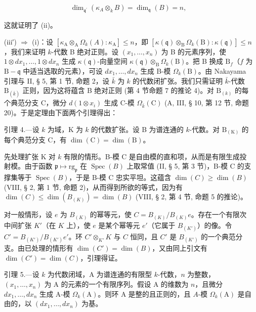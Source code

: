 \[
\dim_ {\mathfrak {q} ^ {\prime}} \left(\kappa_ {A} \otimes_ {k} B\right) = \dim_ {\mathfrak {q}} (B) = n,
\]

这就证明了 (ii)。

(iii′) \(\Rightarrow\) (i)：设 \([\kappa_{\mathrm{A}}\otimes_{\mathrm{A}}\Omega_{k}(A):\kappa_{\mathrm{A}}]\leqslant n\)，即 \([\kappa (\mathfrak{q})\otimes_{\mathrm{B}}\Omega_{k}(\mathrm{B}):\kappa (\mathfrak{q})]\leqslant n\)，我们来证明 \(k\)-代数 B 绝对正则。设 \((x_{1},\ldots ,x_{n})\) 为 B 的元素序列，使 \(1\otimes dx_1,\dots ,1\otimes dx_n\) 生成 \(\kappa (\mathfrak{q})\)-向量空间 \(\kappa (\mathfrak{q})\otimes_{\mathrm{B}}\Omega_{k}(\mathrm{B})\)。把 B 换成 \(\mathrm{B}_f\)（\(f\) 为 \(\mathrm{B} - \mathfrak{q}\) 中适当选取的元素），可设 \(dx_{1},\ldots ,dx_{n}\) 生成 B-模 \(\Omega_k(\mathrm{B})\)。由 Nakayama 引理与 II, § 5, 第 1 节, 命题 2，设 \(\bar{k}\) 为 \(k\) 的代数闭扩张。我们只需证明 \(\bar{k}\)-代数 \(\mathrm{B}_{(\bar{k})}\) 正则，因为这将蕴含 B 绝对正则 (第 4 节命题 7 的推论 4)。对 \(\mathrm{B}_{(k)}\) 的每个典范分支 C，微分 \(d(1\otimes x_i)\) 生成 C-模 \(\Omega_{\bar{k}}(\mathrm{C})\) (A, III, § 10, 第 12 节, 命题 20)。于是定理由下面两个引理得出：

引理 4.—设 \(k\) 为域，K 为 \(k\) 的代数扩张。设 B 为谱连通的 \(k\)-代数。对 \(\mathrm{B}_{(\mathrm{K})}\) 的每个典范分支 C，有 \(\dim(\mathrm{C}) = \dim(\mathrm{B})\)。

先处理扩张 K 对 \(k\) 有限的情形。B-模 C 是自由模的直和项，从而是有限生成投射模。由于函数 \(\mathfrak{p} \mapsto \mathrm{rg}_{\mathfrak{p}}\) 在 \(\operatorname{Spec}(B)\) 上取常值 (II, § 5, 第 3 节)，B-模 C 的支撑集等于 \(\operatorname{Spec}(B)\)，于是 B-模 C 忠实平坦。这蕴含 \(\dim(C) \geqslant \dim(B)\) (VIII, § 2, 第 1 节, 命题 2)，从而得到所欲的等式，因为有 \(\dim(C) \leqslant \dim(B_{(K)}) = \dim(B)\) (VIII, § 2, 第 4 节, 命题 5 的推论)。

对一般情形，设 \(e\) 为 \(B_{(K)}\) 的幂等元，使 \(C = B_{(K)}/B_{(K)}e\)。存在一个有限次中间扩张 \(K'\)（在 \(K\) 上），使 \(e\) 是某个幂等元 \(e'\)（它属于 \(B_{(K')}\)）的像。令 \(C' = B_{(K')} / B_{(K')}e'\)。环 \(C' \otimes_{K'} K\) 与 \(C\) 恒同，且 \(C'\) 是 \(B_{(K')}\) 的一个典范分支。由已处理的情形有 \(\dim(C') = \dim(B)\)，又由同上引文有 \(\dim(C') = \dim(C)\)，引理得证。

引理 5.—设 \(k\) 为代数闭域，A 为谱连通的有限型 \(k\)-代数，\(n\) 为整数，\((x_{1},\ldots,x_{n})\) 为 A 的元素的一个有限序列。假设 A 的维数为 \(n\)，且微分 \(dx_{1},\ldots,dx_{n}\) 生成 A-模 \(\Omega_{k}(\mathrm{A})\)。则环 A 是整的且正则的，且 \(A\)-模 \(\Omega_{k}(\mathrm{A})\) 是自由的，以 \((dx_{1},\ldots,dx_{n})\) 为基。

